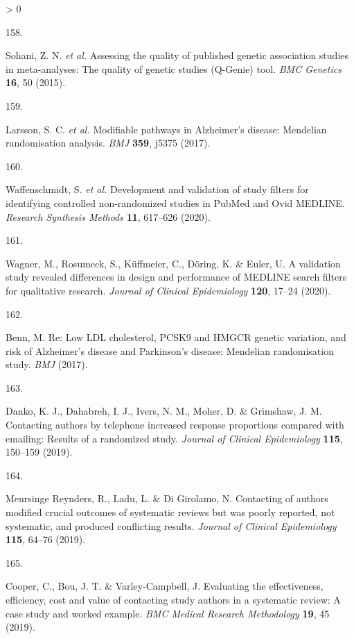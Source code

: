 \documentclass[a4paper, twoside]{templates/ociamthesis}
\newlength{\cslhangindent}
\newlength{\csllabelwidth}
\newenvironment{CSLReferences}[3] %
 {%
  \setlength{\parindent}{0pt}
  \ifodd #1 \everypar{\setlength{\hangindent}{\cslhangindent}}\ignorespaces\fi
  \ifnum #2 > 0
  \setlength{\parskip}{#2\baselineskip}
  \fi
 }%
 {}
\newcommand{\CSLLeftMargin}[1]{\parbox[t]{\maxof{\widthof{#1}}{\csllabelwidth}}{#1}}
\newcommand{\CSLRightInline}[1]{\parbox[t]{\linewidth - \csllabelwidth}{#1}}
\begin{document}
\begin{CSLReferences}{0}{0}
\leavevmode\hypertarget{ref-sohani2015}{}%
\CSLLeftMargin{158. }
\CSLRightInline{Sohani, Z. N. \emph{et al.} Assessing the quality of published genetic association studies in meta-analyses: The quality of genetic studies ({Q}-{Genie}) tool. \emph{BMC Genetics} \textbf{16}, 50 (2015).}

\leavevmode\hypertarget{ref-larsson2017b}{}%
\CSLLeftMargin{159. }
\CSLRightInline{Larsson, S. C. \emph{et al.} Modifiable pathways in {Alzheimer}'s disease: {Mendelian} randomisation analysis. \emph{BMJ} \textbf{359}, j5375 (2017).}

\leavevmode\hypertarget{ref-waffenschmidt2020}{}%
\CSLLeftMargin{160. }
\CSLRightInline{Waffenschmidt, S. \emph{et al.} Development and validation of study filters for identifying controlled non-randomized studies in {PubMed} and {Ovid MEDLINE}. \emph{Research Synthesis Methods} \textbf{11}, 617--626 (2020).}

\leavevmode\hypertarget{ref-wagner2020}{}%
\CSLLeftMargin{161. }
\CSLRightInline{Wagner, M., Rosumeck, S., Küffmeier, C., Döring, K. \& Euler, U. A validation study revealed differences in design and performance of {MEDLINE} search filters for qualitative research. \emph{Journal of Clinical Epidemiology} \textbf{120}, 17--24 (2020).}

\leavevmode\hypertarget{ref-benn2017a}{}%
\CSLLeftMargin{162. }
\CSLRightInline{Benn, M. Re: {Low LDL} cholesterol, {PCSK9} and {HMGCR} genetic variation, and risk of {Alzheimer}'s disease and {Parkinson}'s disease: {Mendelian} randomisation study. \emph{BMJ} (2017).}

\leavevmode\hypertarget{ref-danko2019}{}%
\CSLLeftMargin{163. }
\CSLRightInline{Danko, K. J., Dahabreh, I. J., Ivers, N. M., Moher, D. \& Grimshaw, J. M. Contacting authors by telephone increased response proportions compared with emailing: Results of a randomized study. \emph{Journal of Clinical Epidemiology} \textbf{115}, 150--159 (2019).}

\leavevmode\hypertarget{ref-meursingereynders2019}{}%
\CSLLeftMargin{164. }
\CSLRightInline{Meursinge Reynders, R., Ladu, L. \& Di Girolamo, N. Contacting of authors modified crucial outcomes of systematic reviews but was poorly reported, not systematic, and produced conflicting results. \emph{Journal of Clinical Epidemiology} \textbf{115}, 64--76 (2019).}

\leavevmode\hypertarget{ref-cooper2019}{}%
\CSLLeftMargin{165. }
\CSLRightInline{Cooper, C., Bou, J. T. \& Varley-Campbell, J. Evaluating the effectiveness, efficiency, cost and value of contacting study authors in a systematic review: A case study and worked example. \emph{BMC Medical Research Methodology} \textbf{19}, 45 (2019).}


\end{CSLReferences}
\end{document}
